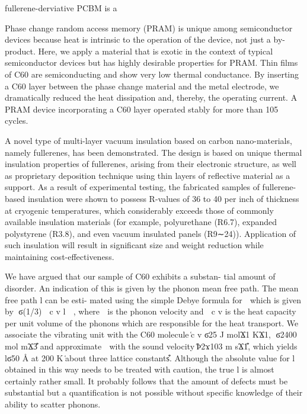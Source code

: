 \documentclass[aps,prb,onecolumn,preprint,superscriptaddress,footinbib,amsmath,amssymb,floatfix]{revtex4}
\begin{document}
fullerene-derviative PCBM is a

Phase change random access memory (PRAM) is unique among semiconductor 
devices because heat is intrinsic to the operation of the device, not 
just a by-product. Here, we apply a material that is exotic in the 
context of typical semiconductor devices but has highly desirable 
properties for PRAM. Thin films of C60 are semiconducting and show very 
low thermal conductance. By inserting a C60 layer between the phase 
change material and the metal electrode, we dramatically reduced the heat 
dissipation and, thereby, the operating current. A PRAM device 
incorporating a C60 layer operated stably for more than 105 cycles.
\cite{kim_fullerene_2008}

A novel type of multi-layer vacuum insulation based on carbon 
nano-materials, namely fullerenes, has been demonstrated. The design 
is based on unique thermal insulation properties of fullerenes, arising 
from their electronic structure, as well as proprietary deposition 
technique using thin layers of reflective material as a support. As a 
result of experimental testing, the fabricated samples of fullerene-based 
insulation were shown to possess R-values of 36 to 40 per inch of 
thickness at cryogenic temperatures, which considerably exceeds those 
of commonly available insulation materials (for example, polyurethane 
(R6.7), expanded polystyrene (R3.8), and even vacuum insulated panels 
(R9∼24)). Application of such insulation will result in significant size 
and weight reduction while maintaining cost-effectiveness.
\cite{wexler_thermal_2004}

We have argued that our sample of C60 exhibits a substan-
tial amount of disorder. An indication of this is given by the
phonon mean free path. The mean free path l can be esti-
mated using the simple Debye formula for ␭ which is given
by ␭ϭ(1/3) ␳ c v l ␯ , where ␯ is the phonon velocity and ␳ c v is
the heat capacity per unit volume of the phonons which are
responsible for the heat transport. We associate the vibrating
unit with the C60 molecule ͑c v ϭ25 J molϪ1 KϪ1, ␳ϭ2400
mol mϪ3͒ and approximate ␯ with the sound velocity
͑Ϸ2ϫ103 m sϪ1͒, which yields lϭ50 Å at 200 K ͑about three
lattice constants͒. Although the absolute value for l obtained
in this way needs to be treated with caution, the true l is
almost certainly rather small. It probably follows that the
amount of defects must be substantial but a quantification is
not possible without specific knowledge of their ability to
scatter phonons.
\cite{andersson_thermal_1995}
\end{document}
